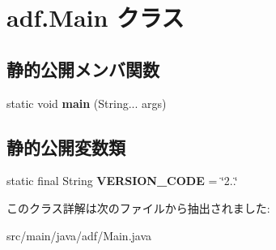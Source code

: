 \hypertarget{classadf_1_1Main}{}\section{adf.\+Main クラス}
\label{classadf_1_1Main}
\subsection*{静的公開メンバ関数}
\begin{DoxyCompactItemize}
\item 
\hypertarget{classadf_1_1Main_a45568b0c48f2f7ddc2105e2a402a83a5}{}\label{classadf_1_1Main_a45568b0c48f2f7ddc2105e2a402a83a5} 
static void {\bfseries main} (String... args)
\end{DoxyCompactItemize}
\subsection*{静的公開変数類}
\begin{DoxyCompactItemize}
\item 
\hypertarget{classadf_1_1Main_a6725c63fe6a57e42c32b0ff3aac3dfbe}{}\label{classadf_1_1Main_a6725c63fe6a57e42c32b0ff3aac3dfbe} 
static final String {\bfseries V\+E\+R\+S\+I\+O\+N\+\_\+\+C\+O\+DE} = \char`\"{}2..\char`\"{}
\end{DoxyCompactItemize}


このクラス詳解は次のファイルから抽出されました\+:\begin{DoxyCompactItemize}
\item 
src/main/java/adf/Main.\+java\end{DoxyCompactItemize}
